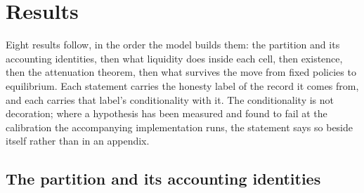 %
%

\section{Results}
\label{sec:results}

Eight results follow, in the order the model builds them: the partition and its accounting
identities, then what liquidity does inside each cell, then existence, then the attenuation theorem,
then what survives the move from fixed policies to equilibrium. Each statement carries the honesty
label of the record it comes from, and each carries that label's conditionality with it. The
conditionality is not decoration; where a hypothesis has been measured and found to fail at the
calibration the accompanying implementation runs, the statement says so beside itself rather than in
an appendix.

\subsection{The partition and its accounting identities}
\label{sec:partition-results}

